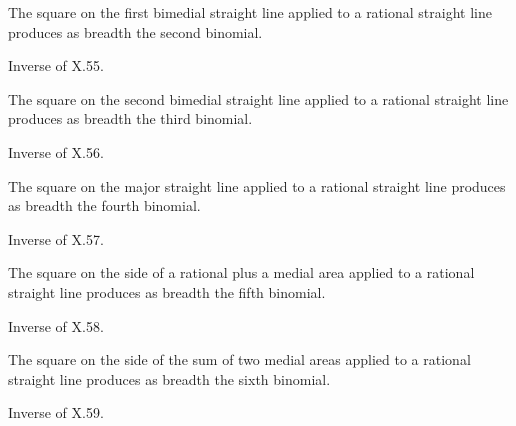 \begin{claim}
\label{prop:X.61}
The square on the first bimedial straight line applied to a rational
straight line produces as breadth the second binomial.
\end{claim}
\begin{evidence}[Proof of X.61]
\label{ev:X.61}
Inverse of X.55.
\end{evidence}

\begin{claim}
\label{prop:X.62}
The square on the second bimedial straight line applied to a rational
straight line produces as breadth the third binomial.
\end{claim}
\begin{evidence}[Proof of X.62]
\label{ev:X.62}
Inverse of X.56.
\end{evidence}

\begin{claim}
\label{prop:X.63}
The square on the major straight line applied to a rational straight
line produces as breadth the fourth binomial.
\end{claim}
\begin{evidence}[Proof of X.63]
\label{ev:X.63}
Inverse of X.57.
\end{evidence}

\begin{claim}
\label{prop:X.64}
The square on the side of a rational plus a medial area applied to
a rational straight line produces as breadth the fifth binomial.
\end{claim}
\begin{evidence}[Proof of X.64]
\label{ev:X.64}
Inverse of X.58.
\end{evidence}

\begin{claim}
\label{prop:X.65}
The square on the side of the sum of two medial areas applied to a
rational straight line produces as breadth the sixth binomial.
\end{claim}
\begin{evidence}[Proof of X.65]
\label{ev:X.65}
Inverse of X.59.
\end{evidence}

